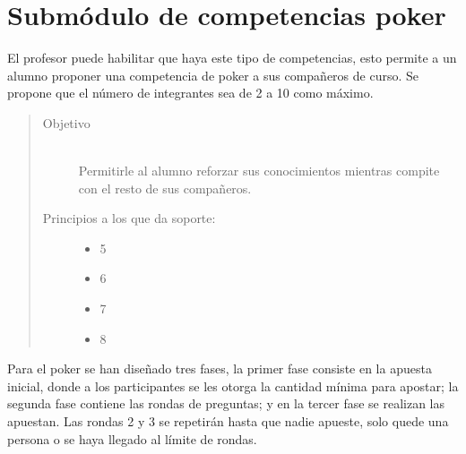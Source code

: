 \section{Submódulo de competencias poker}
    El profesor puede habilitar que haya este tipo de competencias, esto permite a un alumno proponer una competencia de poker a sus compañeros de curso. Se propone que el número de integrantes sea de 2 a 10 como máximo.
    
    \begin{quote}
    \begin{description}
    \item[Objetivo] \hfill\\
        Permitirle al alumno reforzar sus conocimientos mientras compite con el resto de sus compañeros. 
    \item[Principios a los que da soporte:] \hfill
        \begin{itemize}
            \item 5 \principioV
            \item 6 \principioVI
            \item 7 \principioVII 
            \item 8 \principioVIII 
        \end{itemize}
    \end{description}
    \end{quote}
    
    \noindent Para el poker se han diseñado tres fases, la primer fase consiste en la apuesta inicial, donde a los participantes se les otorga la cantidad mínima para apostar; la segunda fase contiene las rondas de preguntas; y en la tercer fase se realizan las apuestan. Las rondas 2 y 3 se repetirán hasta que nadie apueste, solo quede una persona o se haya llegado al límite de rondas.
    
